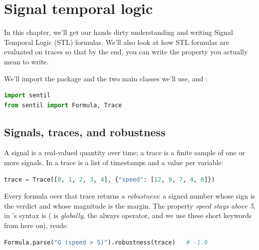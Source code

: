 \chapter{Signal temporal logic}
\label{ch:stl}

In this chapter, we'll get our hands dirty understanding and writing Signal Temporal Logic (STL) formulas. We'll also look at how STL formulas are evaluated on traces so that by the end, you can write the property you actually mean to write.

We'll import the package and the two main classes we'll use,  and :

\begin{lstlisting}[language=Python]
import sentil
from sentil import Formula, Trace
\end{lstlisting}

\section{Signals, traces, and robustness}

A signal is a real-valued quantity over time; a trace is a finite sample of one or more signals. In \sentil{} a trace is a list of timestamps and a value per variable:

\begin{lstlisting}[language=Python]
trace = Trace([0, 1, 2, 3, 4], {"speed": [12, 9, 7, 4, 6]})
\end{lstlisting}

Every formula over that trace returns a \emph{robustness}: a signed number whose sign is the verdict and whose magnitude is the margin. The property \emph{speed stays above 5}, in \sentil's syntax is  ( is \emph{globally}, the always operator, and we use these short keywords from here on), reads:

\begin{lstlisting}[language=Python]
Formula.parse("G (speed > 5)").robustness(trace)   # -1.0
\end{lstlisting}


